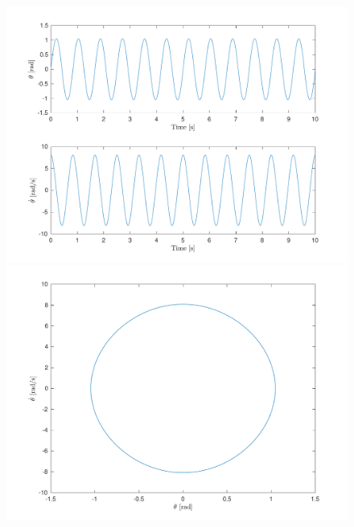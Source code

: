 \documentclass[10pt]{article}
\begin{document}
\begin{figure}[ht]
    \centering
    \begin{minipage}[b]{0.45\textwidth}
        \centering
        \includegraphics[width=1\linewidth]{lab1/figs/section3_x0_1_state_evolution.pdf}
    \end{minipage}
    \begin{minipage}[b]{0.45\textwidth}
        \centering
        \includegraphics[width=1\linewidth]{lab1/figs/section3_x0_1_state_orbit.pdf}
    \end{minipage}
    
    \label{figure:x_0_1_state_evolution}
\end{figure}
    
\end{document}
